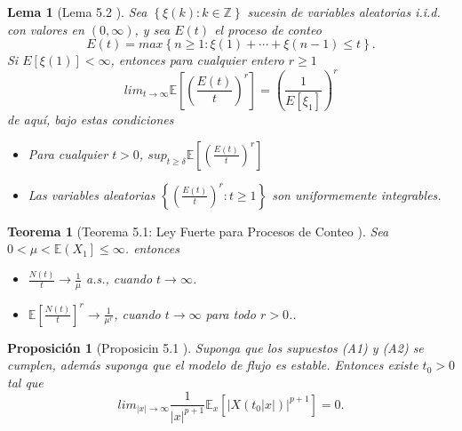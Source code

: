 \documentclass{article}
\newtheorem{Teo}{Teorema}
\newtheorem{Prop}{Proposición}
\newtheorem{Lema}{Lema}
\newcommand{\ent}{\mathbb{Z}}
\newcommand{\esp}{\mathbb{E}}
\begin{document}
\begin{Lema}[Lema 5.2 \cite{Gut}]\label{Lema.5.2.Gut}
Sea $\left\{\xi\left(k\right):k\in\ent\right\}$ sucesin de variables aleatorias i.i.d. con valores en
$\left(0,\infty\right)$, y sea $E\left(t\right)$ el proceso de conteo \[E\left(t\right)=max\left\{n\geq1:\xi\left(1\right)+\cdots+\xi\left(n-1\right)\leq t\right\}.\]
Si $E\left[\xi\left(1\right)\right]<\infty$, entonces para cualquier entero $r\geq1$
\begin{equation}
lim_{t\rightarrow\infty}\esp\left[\left(\frac{E\left(t\right)}{t}\right)^{r}\right]=\left(\frac{1}{E\left[\xi_{1}\right]}\right)^{r}
\end{equation}
de aqu\'i, bajo estas condiciones
\begin{itemize}
\item[a)] Para cualquier $t>0$, $sup_{t\geq\delta}\esp\left[\left(\frac{E\left(t\right)}{t}\right)^{r}\right]$
\item[b)] Las variables aleatorias $\left\{\left(\frac{E\left(t\right)}{t}\right)^{r}:t\geq1\right\}$ son uniformemente integrables.
\end{itemize}
\end{Lema}

\begin{Teo}[Teorema 5.1: Ley Fuerte para Procesos de Conteo \cite{Gut}]\label{Tma.5.1.Gut} Sea $0<\mu<\esp\left(X_{1}\right]\leq\infty$. entonces

\begin{itemize}
\item[a)] $\frac{N\left(t\right)}{t}\rightarrow\frac{1}{\mu}$
a.s., cuando $t\rightarrow\infty$.

\item[b)]$\esp\left[\frac{N\left(t\right)}{t}\right]^{r}\rightarrow\frac{1}{\mu^{r}}$, cuando $t\rightarrow\infty$ para todo $r>0$..
\end{itemize}
\end{Teo}

\begin{Prop}[Proposicin 5.1 \cite{DaiSean}]\label{Prop.5.1}
Suponga que los supuestos (A1) y (A2) se cumplen, adem\'as suponga que el modelo de flujo es estable. Entonces existe $t_{0}>0$ tal que
\begin{equation}\label{Eq.Prop.5.1}
lim_{|x|\rightarrow\infty}\frac{1}{|x|^{p+1}}\esp_{x}\left[|X\left(t_{0}|x|\right)|^{p+1}\right]=0.
\end{equation}

\end{Prop}
\end{document}
